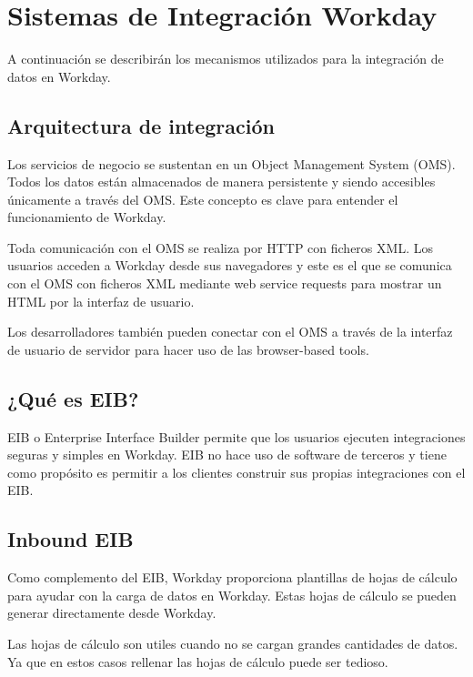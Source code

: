 
\chapter{Sistemas de Integración Workday}

\ifpdf
    \graphicspath{{Chapter2/Figs/Raster/}{Chapter2/Figs/PDF/}{Chapter2/Figs/}}
\else
    \graphicspath{{Chapter2/Figs/Vector/}{Chapter2/Figs/}}
\fi

A continuación se describirán los mecanismos utilizados para la integración de datos en Workday.

\section{Arquitectura de integración}
Los servicios de negocio se sustentan en un Object Management System (OMS). 
Todos los datos están almacenados de manera persistente y siendo accesibles únicamente a través del OMS.
Este concepto es clave para entender el funcionamiento de Workday.

Toda comunicación con el OMS se realiza por HTTP con ficheros XML. Los usuarios acceden a Workday desde sus navegadores y este es el que se comunica con el OMS con ficheros XML mediante web service requests para mostrar un HTML por la interfaz de usuario.

Los desarrolladores también pueden conectar con el OMS a través de la interfaz de usuario de servidor para hacer uso de las browser-based tools.



\section{¿Qué es EIB?}
EIB o Enterprise Interface Builder permite que los usuarios ejecuten integraciones seguras y simples en Workday.
EIB no hace uso de software de terceros y tiene como propósito es permitir a los clientes construir sus propias integraciones con el EIB.


\section{Inbound EIB}

Como complemento del EIB, Workday proporciona plantillas de hojas de cálculo para ayudar con la carga de datos en Workday. Estas hojas de cálculo se pueden generar directamente desde Workday.

Las hojas de cálculo son utiles cuando no se cargan grandes cantidades de datos. Ya que en estos casos rellenar las hojas de cálculo puede ser tedioso.

